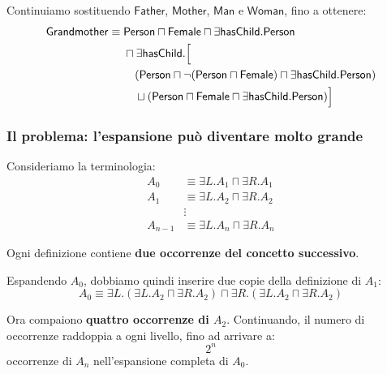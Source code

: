 Continuiamo sostituendo $\mathsf{Father}$, $\mathsf{Mother}$,
$\mathsf{Man}$ e $\mathsf{Woman}$, fino a ottenere:
\[
\begin{aligned}
    \mathsf{Grandmother} \equiv {} &
    \mathsf{Person} \sqcap \mathsf{Female}
    \sqcap \exists\mathsf{hasChild}.\mathsf{Person}\\
    & \sqcap \exists\mathsf{hasChild}.\Bigl[\\
    & \quad (\mathsf{Person} \sqcap
    \neg(\mathsf{Person} \sqcap \mathsf{Female})
    \sqcap \exists\mathsf{hasChild}.\mathsf{Person})\\
    & \quad \sqcup
    (\mathsf{Person} \sqcap \mathsf{Female}
    \sqcap \exists\mathsf{hasChild}.\mathsf{Person})
    \Bigr]
\end{aligned}
\]

\subsubsection{Il problema: l'espansione può diventare molto grande}

Consideriamo la terminologia:
\[
\begin{aligned}
    A_0 &\equiv \exists L.A_1 \sqcap \exists R.A_1\\
    A_1 &\equiv \exists L.A_2 \sqcap \exists R.A_2\\
        &\vdots\\
    A_{n-1} &\equiv \exists L.A_n \sqcap \exists R.A_n
\end{aligned}
\]

Ogni definizione contiene \textbf{due occorrenze del concetto
successivo}.

Espandendo $A_0$, dobbiamo quindi inserire due copie della
definizione di $A_1$:
\[
    A_0 \equiv
    \exists L.(\exists L.A_2 \sqcap \exists R.A_2)
    \sqcap
    \exists R.(\exists L.A_2 \sqcap \exists R.A_2)
\]

Ora compaiono \textbf{quattro occorrenze di $A_2$}.
Continuando, il numero di occorrenze raddoppia a ogni
livello, fino ad arrivare a:
\[
    2^n
\]
occorrenze di $A_n$ nell'espansione completa di $A_0$.